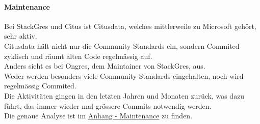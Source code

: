 \begin{flushleft}
    \paragraph{Maintenance}
    Bei StackGres und Citus ist Citusdata, welches mittlerweile zu Microsoft gehört, sehr aktiv.\\
    Citusdata hält nicht nur die Community Standards ein, sondern Commited zyklisch und räumt alten Code regelmässig auf.\\
    Anders sieht es bei Ongres, dem Maintainer von StackGres, aus.\\
    Weder werden besonders viele Community Standards eingehalten, noch wird regelmässig Commited.\\
    Die Aktivitäten gingen in den letzten Jahren und Monaten zurück, was dazu führt, das immer wieder mal grössere Commits notwendig werden.\\
    Die genaue Analyse ist im \hyperref[subsec:maintenance_stackgres_citus]{Anhang - Maintenance} zu finden.
\end{flushleft}